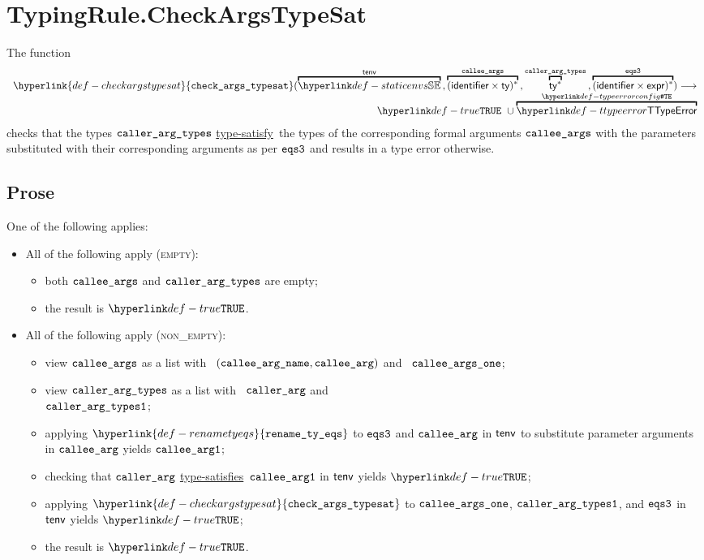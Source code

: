 \documentclass{book}
\newcommand\ProseOrTypeError[0]{\ProseTerminateAs{\TypeErrorConfig}}
\newcommand\checkargstypesat[0]{\hyperlink{def-checkargstypesat}{\texttt{check\_args\_typesat}}}
\newcommand\renametyeqs[0]{\hyperlink{def-renametyeqs}{\texttt{rename\_ty\_eqs}}}
\newcommand\typesatisfies[0]{\hyperlink{def-typesatisfies}{type-satisfies}}
\newcommand\typesatisfy[0]{\hyperlink{def-typesatisfies}{type-satisfy}}
\begin{document}
\section{TypingRule.CheckArgsTypeSat \label{sec:TypingRule.CheckArgsTypeSat}}
\hypertarget{def-checkargstypesat}{}
The function
\[
\begin{array}{r}
  \checkargstypesat(
    \overname{\staticenvs}{\tenv} \aslsep
    \overname{(\identifier\times\ty)^*}{\calleeargs} \aslsep
    \overname{\ty^*}{\callerargtypes} \aslsep
    \overname{(\identifier\times\expr)^*}{\eqsthree}
  ) \aslto \\
  \True\ \cup \overname{\TTypeError}{\TypeErrorConfig}
\end{array}
\]
checks that the types $\texttt{caller\_arg\_types}$ \typesatisfy\ the types of the corresponding
formal arguments $\texttt{callee\_args}$ with the parameters substituted with their corresponding
arguments as per $\texttt{eqs3}$ and results in a type error otherwise.

\subsection{Prose}
One of the following applies:
\begin{itemize}
  \item All of the following apply (\textsc{empty}):
  \begin{itemize}
    \item both $\texttt{callee\_args}$ and $\texttt{caller\_arg\_types}$ are empty;
    \item the result is $\True$.
  \end{itemize}

  \item All of the following apply (\textsc{non\_empty}):
  \begin{itemize}
    \item view $\texttt{callee\_args}$ as a list with \head\ $(\texttt{callee\_arg\_name}, \texttt{callee\_arg})$ and \tail\ $\texttt{callee\_args\_one}$;
    \item view $\texttt{caller\_arg\_types}$ as a list with \head\ $\texttt{caller\_arg}$ and \tail\ \\
          $\texttt{caller\_arg\_types1}$;
    \item applying $\renametyeqs$ to $\texttt{eqs3}$ and $\texttt{callee\_arg}$ in $\textsf{tenv}$
          to substitute parameter arguments in $\texttt{callee\_arg}$ yields $\texttt{callee\_arg1}$\ProseOrTypeError;
    \item checking that $\texttt{caller\_arg}$ \typesatisfies\ $\texttt{callee\_arg1}$ in $\textsf{tenv}$ yields $\True$\ProseOrTypeError;
    \item applying $\checkargstypesat$ to $\texttt{callee\_args\_one}$, $\texttt{caller\_arg\_types1}$, and $\texttt{eqs3}$ in $\textsf{tenv}$
          yields $\True$\ProseOrTypeError;
    \item the result is $\True$.
  \end{itemize}
\end{itemize}
\end{document}
